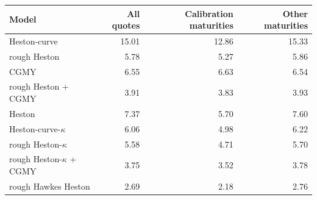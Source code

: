 \begin{tabular}{lrrr}
\toprule
Model & All quotes & Calibration maturities & Other maturities\\
\midrule
Heston-curve & 15.01 & 12.86 & 15.33\\
rough Heston & 5.78 & 5.27 & 5.86\\
CGMY & 6.55 & 6.63 & 6.54\\
rough Heston + CGMY & 3.91 & 3.83 & 3.93\\
\addlinespace
Heston & 7.37 & 5.70 & 7.60\\
Heston-curve-$\kappa$ & 6.06 & 4.98 & 6.22\\
rough Heston-$\kappa$ & 5.58 & 4.71 & 5.70\\
rough Heston-$\kappa$ + CGMY & 3.75 & 3.52 & 3.78\\
rough Hawkes Heston & 2.69 & 2.18 & 2.76\\
\bottomrule
\end{tabular}
